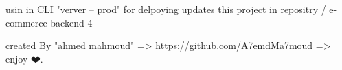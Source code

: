 usin in CLI "verver -- prod" for delpoying updates
this project in repositry / e-commerce-backend-4

created By "ahmed mahmoud"
=> https://github.com/A7emdMa7moud
=> enjoy ❤️.